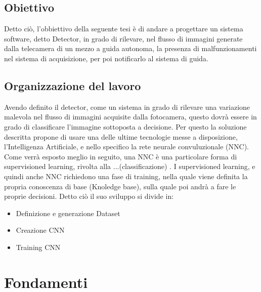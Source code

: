 \documentclass[14pt]{extarticle}
\begin{document}
\subsection{Obiettivo}
Detto ciò, l'obbiettivo della seguente tesi è di andare a progettare un sistema software, detto Detector, in grado di rilevare, nel flusso di immagini generate dalla telecamera di un mezzo a guida autonoma, la presenza di malfunzionamenti nel sistema di acquisizione, per poi notificarlo al sistema  di guida.
\subsection{Organizzazione del lavoro} 
Avendo definito il detector, come un sistema in grado di rilevare una variazione malevola nel flusso di immagini acquisite dalla fotocamera, questo dovrà essere in grado di classificare l'immagine sottoposta a decisione. Per questo la soluzione descritta propone di usare una delle ultime tecnologie messe a disposizione, l'Intelligenza Artificiale, e nello specifico la rete neurale convuluzionale (NNC).
Come verrà esposto meglio in seguito, una NNC è una particolare forma di supervisioned learning, rivolta alla ...(classificazione) . I supervisioned learning, e quindi anche NNC richiedono una fase di training, nella quale viene definita  la propria conoscenza di base (Knoledge base), sulla quale poi andrà a fare le proprie decisioni.
Detto ciò il suo sviluppo si divide in:
\begin{itemize}
\item Definizione e generazione Dataset
\item Creazione CNN
\item Training CNN
\end{itemize}
\section{Fondamenti}
\end{document}

